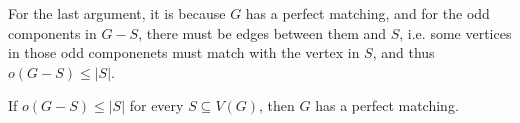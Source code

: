 \begin{remark}
    For the last argument, it is because \(G\) has a perfect matching, and for the odd components in \(G - S\), there must be edges between them and \(S\), i.e. some vertices in those odd componenets must match with the vertex in \(S\), and thus \(o(G - S) \le \vert S \vert \).
    
    \begin{figure}[H]
        \centering
    \end{figure}
\end{remark}

\begin{theorem}[Tutte, 1947]
    If \(o(G - S) \le \vert S \vert \) for every \(S \subseteq V(G)\), then \(G\) has a perfect matching.   
\end{theorem}
